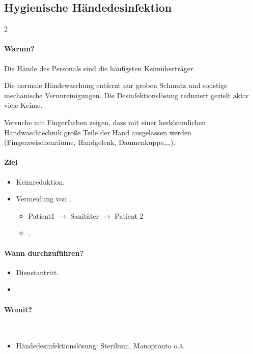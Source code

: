 \clearpage
\subsection{Hygienische Händedesinfektion}
\label{topic:hygienische-haendedesfinfektion}
% 

\begin{gWideParEnv}

\begin{multicols}{2}
\paragraph{Warum?} 
Die Hände des Personals sind die
häufigsten Keimüberträger. 

Die normale Händewaschung entfernt nur groben Schmutz und
sonstige mechanische Verunreinigungen. Die
Desinfektionslösung reduziert gezielt aktiv viele Keime. 

Versuche mit Fingerfarben
zeigen, dass mit einer herkömmlichen Handwaschtechnik große
Teile der Hand ausgelassen werden (Fingerzwischenräume,
Handgelenk, Daumenkuppe,\ldots).

\begin{minipage}{\linewidth}

\paragraph{Ziel}
\begin{itemize}
    \item Keimreduktion.
    \item Vermeidung von .
    \begin{itemize}
        \item Patient1 ${\rightarrow}$ Sanitäter ${\rightarrow}$ Patient 2
        \item {}.
    \end{itemize}
\end{itemize}
\paragraph{Wann durchzuführen?}
\begin{itemize}
    \item Dienstantritt.
    \item {}
\end{itemize}
\paragraph{Womit?}~
\begin{itemize}
    \item Händedesinfektionslösung:
    Sterilium\texttrademark{}, Manopronto\texttrademark{}
    o.ä.
\end{itemize}
\end{minipage}
\end{multicols}
\end{gWideParEnv}
